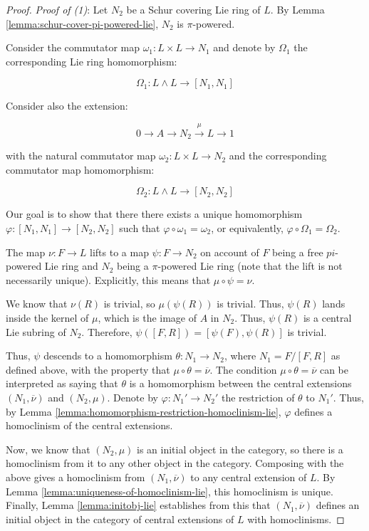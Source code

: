 \begin{proof}
  {\em Proof of (1)}: Let $N_2$ be a Schur covering Lie ring of $L$. By
  Lemma \ref{lemma:schur-cover-pi-powered-lie}, $N_2$ is $\pi$-powered.

  Consider the commutator map $\omega_1:L \times L \to N_1$ and denote
  by $\Omega_1$ the corresponding Lie ring homomorphism:

  $$\Omega_1: L \wedge L \to [N_1,N_1]$$

  Consider also the extension:

  $$0 \to A \to N_2 \stackrel{\mu}{\to} L \to 1$$
  
  with the natural commutator map $\omega_2:L \times L \to N_2$ and the
  corresponding commutator map homomorphism:

  $$\Omega_2:L \wedge L \to [N_2,N_2]$$
  
  Our goal is to show that there there exists a unique homomorphism
  $\varphi:[N_1,N_1] \to [N_2,N_2]$ such that $\varphi \circ
  \omega_1 = \omega_2$, or equivalently, $\varphi \circ \Omega_1 =
  \Omega_2$.

  The map $\nu:F \to L$ lifts to a map $\psi:F \to N_2$ on account of
  $F$ being a free $pi$-powered Lie ring and $N_2$ being a $\pi$-powered
  Lie ring (note that the lift is not necessarily unique). Explicitly,
  this means that $\mu \circ \psi = \nu$.

  We know that $\nu(R)$ is trivial, so $\mu(\psi(R))$ is trivial. Thus,
  $\psi(R)$ lands inside the kernel of $\mu$, which is the image of $A$
  in $N_2$. Thus, $\psi(R)$ is a central Lie subring of $N_2$. Therefore,
  $\psi([F,R]) = [\psi(F),\psi(R)]$ is trivial.
  
  Thus, $\psi$ descends to a homomorphism $\theta:N_1 \to N_2$, where
  $N_1 = F/[F,R]$ as defined above, with the property that $\mu \circ
  \theta = \overline{\nu}$. The condition $\mu \circ \theta =
  \overline{\nu}$ can be interpreted as saying that $\theta$ is a
  homomorphism between the central extensions $(N_1,\overline{\nu})$ and
  $(N_2,\mu)$. Denote by $\varphi:N_1' \to N_2'$ the restriction of
  $\theta$ to $N_1'$. Thus, by Lemma
  \ref{lemma:homomorphism-restriction-homoclinism-lie}, $\varphi$ defines a
  homoclinism of the central extensions. 

  Now, we know that $(N_2,\mu)$ is an initial object in the category,
  so there is a homoclinism from it to any other object in the
  category. Composing with the above gives a homoclinism from
  $(N_1,\overline{\nu})$ to any central extension of $L$. By Lemma
  \ref{lemma:uniqueness-of-homoclinism-lie}, this homoclinism is
  unique. Finally, Lemma \ref{lemma:initobj-lie} establishes from this that
  $(N_1,\overline{\nu})$ defines an initial object in the category of central
  extensions of $L$ with homoclinisms.


\end{proof}

